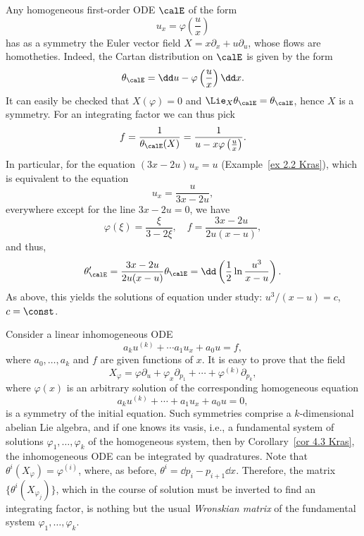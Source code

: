 \begin{example}
    Any homogeneous first-order ODE $\calE$ of the form
    \[u_x=\varphi\left(\frac{u}{x}\right)\]
    has as a symmetry the Euler vector field $X=x\partial_x+u\partial_u$, whose flows are homotheties. Indeed, the Cartan distribution on $\calE$ is given by the form 
    \[\theta_\calE=\dd u-\varphi\left(\frac{u}{x}\right)\dd x.\]
    It can easily be checked that $X(\varphi)=0$ and $\Lie_X\theta_\calE=\theta_\calE$, hence $X$ is a symmetry. For an integrating factor we can thus pick 
    \[f=\frac{1}{\theta_\calE(X)}=\frac{1}{u-x\varphi\left(\frac{u}{x}\right)}.\]
    In particular, for the equation $(3x-2u)u_x=u$ (Example~\ref{ex 2.2 Kras}), which is equivalent to the equation 
    \[u_x=\frac{u}{3x-2u},\]
    everywhere except for the line $3x-2u=0$, we have 
    \[\varphi(\xi)=\frac{\xi}{3-2\xi},\quad f=\frac{3x-2u}{2u(x-u)},\]
    and thus,
    \[\theta_\calE'=\frac{3x-2u}{2u(x-u)}\theta_\calE=\dd\left(\frac12\ln\frac{u^3}{x-u}\right).\]
    As above, this yields the solutions of equation under study: $u^3/(x-u)=c$, $c=\const$.
\end{example}


\begin{example}
    Consider a linear inhomogeneous ODE 
    \[a_ku^{(k)}+\cdots a_1u_x+a_0u=f,\]
    where $a_0,\ldots,a_k$ and $f$ are given functions of $x$. It is easy to prove that the field 
    \[X_\varphi=\varphi\partial_u+\varphi_x\partial_{p_1}+\cdots+\varphi^{(k)}\partial_{p_k},\]
    where $\varphi(x)$ is an arbitrary solution of the corresponding homogeneous equation 
    \[a_ku^{(k)}+\cdots+a_1u_x+a_0u=0,\]
    is a symmetry of the initial equation. Such symmetries comprise a $k$-dimensional abelian Lie algebra, and if one knows its vasis, i.e., a fundamental system of solutions $\varphi_1,\ldots,\varphi_k$ of the homogeneous system, then by Corollary~\ref{cor 4.3 Kras}, the inhomogeneous ODE can be integrated by quadratures. Note that $\theta^i(X_\varphi)=\varphi^{(i)}$, where, as before, $\theta^i=\dd p_i-p_{i+1}\dd x$. Therefore, the matrix $\{\theta^i(X_{\varphi_j})\}$, which in the course of solution must be inverted to find an integrating factor, is nothing but the usual \emph{Wronskian matrix} of the fundamental system $\varphi_1,\ldots,\varphi_k$.
\end{example}

